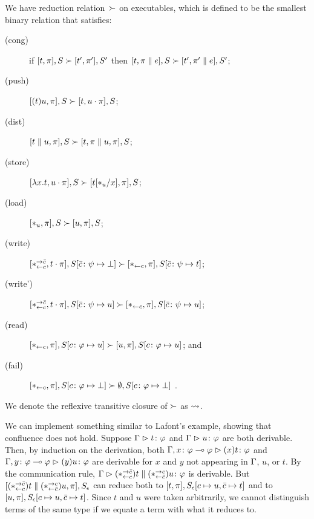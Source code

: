 We have reduction relation~$\succ$ on executables,
which is defined to be the smallest binary relation
that satisfies:
\begin{description}
 \item[(cong)] if
	    $[t,\pi],         S \succ [ t',\pi'],        S'$
	    then
	    $[t,\pi \parallel e], S \succ [ t',\pi'\parallel e], S'$\enspace;
 \item[(push)]
	    $[(t)u,\pi],S       \succ [t,u\cdot\pi],S$;
 \item[(dist)]
	    $[t\parallel u,\pi],S   \succ [t,\pi\parallel u,\pi],S$\enspace;
 \item[(store)]
	    $[\lambda x.t,u\cdot\pi],S
	     \succ
	     [t[\ast_u/x],      \pi],S$\enspace;
 \item[(load)]
	    $[\ast_u,\pi],S\succ[u,\pi],S$\enspace;
 \item[(write)]
	    $
	    [\ast^{\rightarrow {\bar{c}}}_{\leftarrow{c}}, t\cdot\pi], S[\bar{c}\colon\psi\mapsto\bot]
	    \succ
	    [\ast_{\leftarrow{c}}, \pi],
	    S[\bar{c}\colon\psi\mapsto t]
	    $\enspace;
 \item[(write')]
	    $
	    [\ast^{\rightarrow {\bar{c}}}_{\leftarrow{c}}, t\cdot\pi], S[\bar{c}\colon\psi\mapsto u]
	    \succ
	    [\ast_{\leftarrow{c}}, \pi],
	    S[\bar{c}\colon\psi\mapsto u]
	    $\enspace;
 \item[(read)]$
	    [\ast_{\leftarrow{c}} ,\pi],
	    S[c\colon\varphi\mapsto u]
	    \succ
	    [u,\pi],
	    S[c\colon\varphi\mapsto u]
	    $\enspace; and
 \item[(fail)]
	    $
	    [\ast_{\leftarrow{c}},\pi],
	    S[c\colon\varphi\mapsto \bot]
	    \succ
	    \emptyset,S[c\colon\varphi\mapsto \bot]
	    $
	    \enspace.
\end{description}
We denote the reflexive transitive closure of $\succ$ as $\rightsquigarrow$.


We can implement something similar to Lafont's example,
showing that confluence does not hold.
Suppose $\Gamma\vartriangleright{t} \colon{\varphi}$ and $\Gamma\vartriangleright{u} \colon{\varphi}$ are both derivable.
Then, by induction on the derivation,
both $\Gamma,{x} \colon{\varphi\multimap\varphi}\vartriangleright{(x)t} \colon{\varphi}$
and $\Gamma,{y} \colon{\varphi\multimap\varphi}\vartriangleright{(y)u} \colon{\varphi}$ are derivable
for $x$ and $y$ not appearing in $\Gamma$, $u$, or $t$.
By the communication rule,
$\Gamma\vartriangleright{(\ast^{\rightarrow {\bar{c}}}_{\leftarrow{c}})t\parallel(\ast^{\rightarrow {c}}_{\leftarrow{\bar{c}}})u} \colon{\varphi}$ is derivable.
But $[(\ast^{\rightarrow {\bar{c}}}_{\leftarrow{c}})t\parallel (\ast^{\rightarrow {c}}_{\leftarrow{\bar{c}}})u,
\pi],S_\epsilon$
can reduce both to $[t,\pi], S_\epsilon[c\mapsto u, \bar{c}\mapsto t]$
and to $[u,\pi], S_\epsilon[c\mapsto u,\bar{c}\mapsto t]$.
Since $t$ and $u$ were taken arbitrarily, we cannot distinguish terms
of the same type if we equate a term with what it reduces to.


